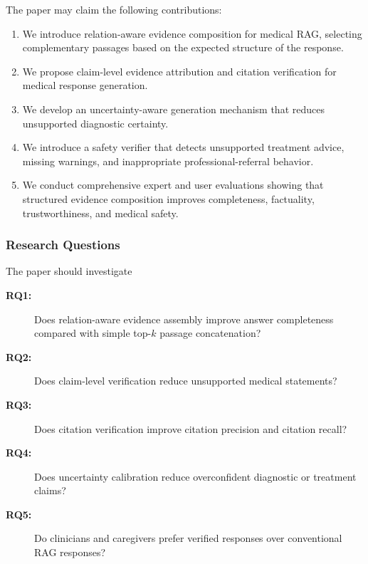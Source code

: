 \documentclass{article}
\begin{document}
The paper may claim the following contributions:
\begin{enumerate}
    \item We introduce relation-aware evidence composition for medical RAG, selecting complementary passages based on the expected structure of the response.

    \item We propose claim-level evidence attribution and citation verification for medical response generation.

    \item We develop an uncertainty-aware generation mechanism that reduces unsupported diagnostic certainty.

    \item We introduce a safety verifier that detects unsupported treatment advice, missing warnings, and inappropriate professional-referral behavior.

    \item We conduct comprehensive expert and user evaluations showing that structured evidence composition improves completeness, factuality, trustworthiness, and medical safety.
\end{enumerate}

\subsubsection{Research Questions}
The paper should investigate
\begin{description}
    \item[\textbf{RQ1:}]
    Does relation-aware evidence assembly improve answer completeness compared with simple top-$k$ passage concatenation?

    \item[\textbf{RQ2:}]
    Does claim-level verification reduce unsupported medical statements?

    \item[\textbf{RQ3:}]
    Does citation verification improve citation precision and citation recall?

    \item[\textbf{RQ4:}]
    Does uncertainty calibration reduce overconfident diagnostic or treatment claims?

    \item[\textbf{RQ5:}]
    Do clinicians and caregivers prefer verified responses over conventional
    RAG responses?
\end{description}
\end{document}
